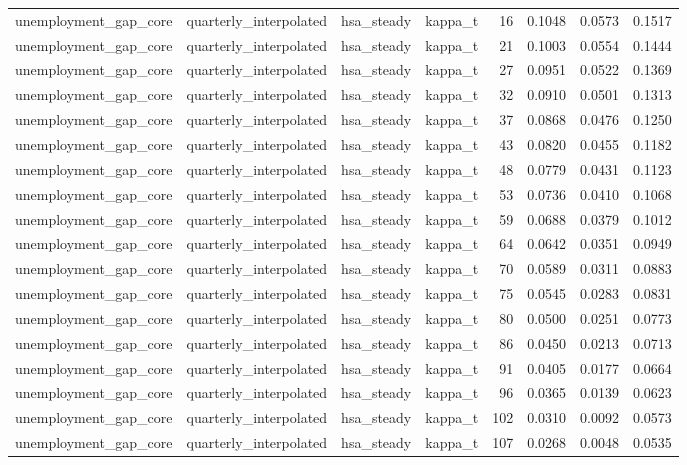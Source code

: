 \begin{tabular}{llllrrrr}
unemployment\_gap\_core & quarterly\_interpolated & hsa\_steady & kappa\_t & 16 & 0.1048 & 0.0573 & 0.1517 \\
unemployment\_gap\_core & quarterly\_interpolated & hsa\_steady & kappa\_t & 21 & 0.1003 & 0.0554 & 0.1444 \\
unemployment\_gap\_core & quarterly\_interpolated & hsa\_steady & kappa\_t & 27 & 0.0951 & 0.0522 & 0.1369 \\
unemployment\_gap\_core & quarterly\_interpolated & hsa\_steady & kappa\_t & 32 & 0.0910 & 0.0501 & 0.1313 \\
unemployment\_gap\_core & quarterly\_interpolated & hsa\_steady & kappa\_t & 37 & 0.0868 & 0.0476 & 0.1250 \\
unemployment\_gap\_core & quarterly\_interpolated & hsa\_steady & kappa\_t & 43 & 0.0820 & 0.0455 & 0.1182 \\
unemployment\_gap\_core & quarterly\_interpolated & hsa\_steady & kappa\_t & 48 & 0.0779 & 0.0431 & 0.1123 \\
unemployment\_gap\_core & quarterly\_interpolated & hsa\_steady & kappa\_t & 53 & 0.0736 & 0.0410 & 0.1068 \\
unemployment\_gap\_core & quarterly\_interpolated & hsa\_steady & kappa\_t & 59 & 0.0688 & 0.0379 & 0.1012 \\
unemployment\_gap\_core & quarterly\_interpolated & hsa\_steady & kappa\_t & 64 & 0.0642 & 0.0351 & 0.0949 \\
unemployment\_gap\_core & quarterly\_interpolated & hsa\_steady & kappa\_t & 70 & 0.0589 & 0.0311 & 0.0883 \\
unemployment\_gap\_core & quarterly\_interpolated & hsa\_steady & kappa\_t & 75 & 0.0545 & 0.0283 & 0.0831 \\
unemployment\_gap\_core & quarterly\_interpolated & hsa\_steady & kappa\_t & 80 & 0.0500 & 0.0251 & 0.0773 \\
unemployment\_gap\_core & quarterly\_interpolated & hsa\_steady & kappa\_t & 86 & 0.0450 & 0.0213 & 0.0713 \\
unemployment\_gap\_core & quarterly\_interpolated & hsa\_steady & kappa\_t & 91 & 0.0405 & 0.0177 & 0.0664 \\
unemployment\_gap\_core & quarterly\_interpolated & hsa\_steady & kappa\_t & 96 & 0.0365 & 0.0139 & 0.0623 \\
unemployment\_gap\_core & quarterly\_interpolated & hsa\_steady & kappa\_t & 102 & 0.0310 & 0.0092 & 0.0573 \\
unemployment\_gap\_core & quarterly\_interpolated & hsa\_steady & kappa\_t & 107 & 0.0268 & 0.0048 & 0.0535 \\

\end{tabular}

